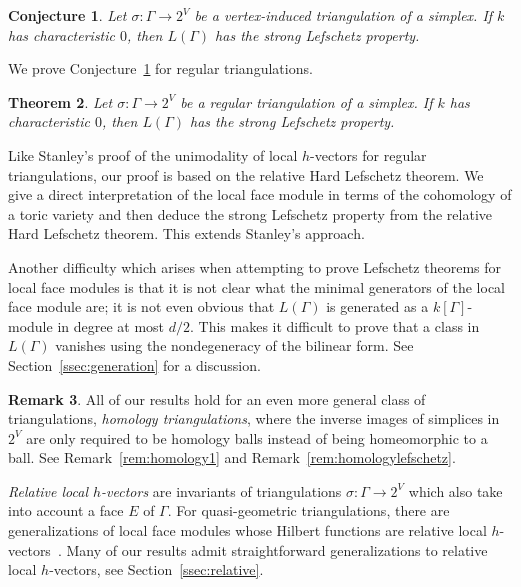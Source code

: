 \documentclass[11pt]{article}
\newtheorem{theo}{Theorem}[section]
\newtheorem{conj}[theo]{Conjecture}
\theoremstyle{definition}
\newtheorem{rema}[theo]{Remark}
\numberwithin{equation}{section}
\numberwithin{equation}{section}
\begin{document}
\begin{conj}\label{conj:char0}
Let $\sigma \colon \Gamma \to 2^V$ be a vertex-induced triangulation of a simplex. If $k$ has characteristic $0$, then $L(\Gamma)$ has the strong Lefschetz property. 
\end{conj}

We prove Conjecture~\ref{conj:char0} for regular triangulations. 

\begin{theo}\label{thm:regular}
Let $\sigma \colon \Gamma \to 2^V$ be a regular triangulation of a simplex. If $k$ has characteristic $0$, then $L(\Gamma)$ has the strong Lefschetz property. 
\end{theo}

Like Stanley's proof of the unimodality of local $h$-vectors for regular triangulations, our proof is based on the relative Hard Lefschetz theorem. We give a direct interpretation of the local face module in terms of the cohomology of a toric variety and then deduce the strong Lefschetz property from the relative Hard Lefschetz theorem. This extends Stanley's approach. 

Another difficulty which arises when attempting to 
prove Lefschetz theorems for local face modules is that it is not clear what the minimal generators of the local face module are; it is not even obvious that $L(\Gamma)$ is generated as a $k[\Gamma]$-module in degree at most $d/2$. This makes it difficult to prove that a class in $L(\Gamma)$ vanishes using the nondegeneracy of the bilinear form. See Section~\ref{ssec:generation} for a discussion. 

\begin{rema}
All of our results hold for an even more general class of triangulations, \emph{homology triangulations}, where the inverse images of simplices in $2^V$ are only required to be homology balls instead of being homeomorphic to a ball. See Remark~\ref{rem:homology1} and Remark~\ref{rem:homologylefschetz}.
\end{rema}

\emph{Relative local $h$-vectors} are invariants of triangulations $\sigma \colon \Gamma \to 2^V$ which also take into account a face $E$ of $\Gamma$. For quasi-geometric triangulations, there are generalizations of local face modules whose Hilbert functions are relative local $h$-vectors~\cite{Athanasiadis12b,LPS1}.
Many of our results admit straightforward generalizations to relative local $h$-vectors, see Section~\ref{ssec:relative}.
\end{document}
